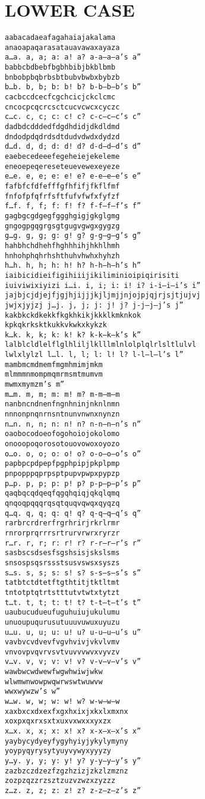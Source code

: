 \documentclass{article}
\begin{document}
\section{LOWER CASE}

\begin{verbatim}
aabacadaeafagahaiajakalama
anaoapaqarasatauavawaxayaza
a…a. a, a; a: a! a? a-a–a—a’s a”
babbcbdbebfbgbhbibjbkblbmb
bnbobpbqbrbsbtbubvbwbxbybzb
b…b. b, b; b: b! b? b-b–b—b’s b”
cacbccdcecfcgchcicjckclcmc
cncocpcqcrcsctcucvcwcxcyczc
c…c. c, c; c: c! c? c-c–c—c’s c”
dadbdcdddedfdgdhdidjdkdldmd
dndodpdqdrdsdtdudvdwdxdydzd
d…d. d, d; d: d! d? d-d–d—d’s d”
eaebecedeeefegeheiejekeleme
eneoepeqereseteuevewexeyeze
e…e. e, e; e: e! e? e-e–e—e’s e”
fafbfcfdfefffgfhfifjfkflfmf
fnfofpfqfrfsftfufvfwfxfyfzf
f…f. f, f; f: f! f? f-f–f—f’s f”
gagbgcgdgegfggghgigjgkglgmg
gngogpgqgrgsgtgugvgwgxgygzg
g…g. g, g; g: g! g? g-g–g—g’s g”
hahbhchdhehfhghhhihjhkhlhmh
hnhohphqhrhshthuhvhwhxhyhzh
h…h. h, h; h: h! h? h-h–h—h’s h”
iaibicidieifigihiiijikiliminioipiqirisiti
iuiviwixiyizi i…i. i, i; i: i! i? i-i–i—i’s i”
jajbjcjdjejfjgjhjijjjkjljmjjnjojpjqjrjsjtjujvj
jwjxjyjzj j…j. j, j; j: j! j? j-j–j—j’s j”
kakbkckdkekkfkgkhkikjkkklkmknkok
kpkqkrksktkukkvkwkxkykzk
k…k. k, k; k: k! k? k-k–k—k’s k”
lalblcldlelflglhliljlklllmlnlolplqlrlsltlulvl
lwlxlylzl l…l. l, l; l: l! l? l-l–l—l’s l”
mambmcmdmemfmgmhmimjmkm
mlmmmnmompmqmrmsmtmumvm
mwmxmymzm’s m”
m…m. m, m; m: m! m? m-m–m—m
nanbncndnenfngnhninjnknlnmn
nnnonpnqnrnsntnunvnwnxnynzn
n…n. n, n; n: n! n? n-n–n—n’s n”
oaobocodoeofogohoiojokolomo
onooopoqorosotouovowoxoyozo
o…o. o, o; o: o! o? o-o–o—o’s o”
papbpcpdpepfpgphpipjpkplpmp
pnpopppqprpsptpupvpwpxpypzp
p…p. p, p; p: p! p? p-p–p—p’s p”
qaqbqcqdqeqfqgqhqiqjqkqlqmq
qnqoqpqqqrqsqtquqvqwqxqyqzq
q…q. q, q; q: q! q? q-q–q—q’s q”
rarbrcrdrerfrgrhrirjrkrlrmr
rnrorprqrrrsrtrurvrwrxryrzr
r…r. r, r; r: r! r? r-r–r—r’s r”
sasbscsdsesfsgshsisjskslsms
snsospsqsrssstsusvswsxsyszs
s…s. s, s; s: s! s? s-s–s—s’s s”
tatbtctdtetftgthtitjtktltmt
tntotptqtrtstttutvtwtxtytzt
t…t. t, t; t: t! t? t-t–t—t’s t”
uaubucudueufuguhuiujukulumu
unuoupuqurusutuuuvuwuxuyuzu
u…u. u, u; u: u! u? u-u–u—u’s u”
vavbvcvdvevfvgvhvivjvkvlvmv
vnvovpvqvrvsvtvuvvvwvxvyvzv
v…v. v, v; v: v! v? v-v–v—v’s v”
wawbwcwdwewfwgwhwiwjwkw
wlwmwnwowpwqwrwswtwuwvw
wwxwywzw’s w”
w…w. w, w; w: w! w? w-w–w—w
xaxbxcxdxexfxgxhxixjxkxlxmxnx
xoxpxqxrxsxtxuxvxwxxxyxzx
x…x. x, x; x: x! x? x-x–x—x’s x”
yaybycydyeyfygyhyiyjykylymyny
yoypyqyrysytyuyvywyxyyyzy
y…y. y, y; y: y! y? y-y–y—y’s y”
zazbzczdzezfzgzhzizjzkzlzmznz
zozpzqzzrzsztzuzvzwzxzyzzz
z…z. z, z; z: z! z? z-z–z—z’s z”
\end{verbatim}
\end{document}
